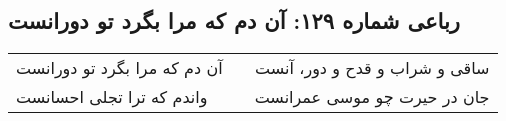 \begin{center}
\section*{رباعی شماره ۱۲۹: آن دم که مرا بگرد تو دورانست}
\label{sec:0129}
\begin{longtable}{l p{0.5cm} r}
آن دم که مرا بگرد تو دورانست
&&
ساقی و شراب و قدح و دور، آنست
\\
واندم که ترا تجلی احسانست
&&
جان در حیرت چو موسی عمرانست
\\
\end{longtable}
\end{center}
